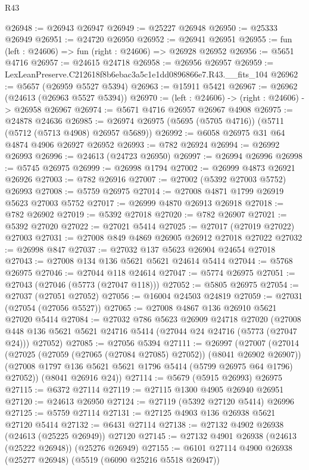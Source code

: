 \begin{lexlean}{R43}
\begin{coremodule}
@26948 := @26943 @26947
@26949 := @25227 @26948
@26950 := @25333 @26949
@26951 := @24720 @26950
@26952 := @26941 @26951
@26955 := fun (left : @24606) => fun (right : @24606) => @26928 @26952
@26956 := @5651 @4716
@26957 := @24615 @24718
@26958 := @26956 @26957
@26959 := LexLeanPreserve.C212618f8b6ebac3a5c1e1dd0896866e7.R43.__fits_104
@26962 := @5657 (@26959 @5527 @5394)
@26963 := @15911 @5421
@26967 := @26962 (@24613 (@26963 @5527 @5394))
@26970 := (left : @24606) -> (right : @24606) -> @26958 @26967
@26974 := @5671 @4716 @26957 @26967 @4908
@26975 := @24878 @24636
@26985 := @26974 @26975 (@5695 (@5705 @4716)) (@5711 (@5712 (@5713 @4908) @26957 @5689))
@26992 := @6058 @26975 @31 @64 @4874 @4906 @26927 @26952
@26993 := @782 @26924
@26994 := @26992 @26993
@26996 := @24613 (@24723 @26950)
@26997 := @26994 @26996
@26998 := @5745 @26975
@26999 := @26998 @1794
@27002 := @26999 @4873 @26921 @26926
@27003 := @782 @26916
@27007 := @27002 (@5392 @27003 @5752) @26993
@27008 := @5759 @26975
@27014 := @27008 @4871 @1799 @26919 @5623 @27003 @5752
@27017 := @26999 @4870 @26913 @26918
@27018 := @782 @26902
@27019 := @5392 @27018
@27020 := @782 @26907
@27021 := @5392 @27020
@27022 := @27021 @5414
@27025 := @27017 (@27019 @27022) @27003
@27031 := @27008 @849 @4869 @26905 @26912 @27018 @27022
@27032 := @26998 @847
@27037 := @27032 @137 @5623 @26904 @24654 @27018
@27043 := @27008 @134 @136 @5621 @5621 @24614 @5414
@27044 := @5768 @26975
@27046 := @27044 @118 @24614
@27047 := @5774 @26975
@27051 := @27043 (@27046 (@5773 (@27047 @118)))
@27052 := @5805 @26975
@27054 := @27037 (@27051 @27052)
@27056 := @16004 @24503 @24819
@27059 := @27031 (@27054 (@27056 @5527))
@27065 := @27008 @4867 @136 @26910 @5621 @27020 @5414
@27084 := @27032
    @786
    @5623
    @26909
    @24718
    @27020
    (@27008 @448 @136 @5621 @5621 @24716 @5414 (@27044 @24 @24716 (@5773 (@27047 @24))) @27052)
@27085 := @27056 @5394
@27111 := @26997
    (@27007
      (@27014
        (@27025 (@27059 (@27065 (@27084 @27085) @27052)) (@8041 @26902 @26907))
        (@27008 @1797 @136 @5621 @5621 @1796 @5414 (@5799 @26975 @64 @1796) @27052))
      (@8041 @26916 @24))
@27114 := @5679 (@5915 @26993) @26975
@27115 := @6372 @27114
@27119 := @27115 @1300 @4905 @26940 @26951
@27120 := @24613 @26950
@27124 := @27119 (@5392 @27120 @5414) @26996
@27125 := @5759 @27114
@27131 := @27125 @4903 @136 @26938 @5621 @27120 @5414
@27132 := @6431 @27114
@27138 := @27132 @4902 @26938 (@24613 (@25225 @26949)) @27120
@27145 := @27132 @4901 @26938 (@24613 (@25222 @26948)) (@25276 @26949)
@27155 := @6101 @27114 @4900 @26938 (@25277 @26948) (@5519 (@6090 @25216 @5518 @26947))

\end{coremodule}
\end{lexlean}
